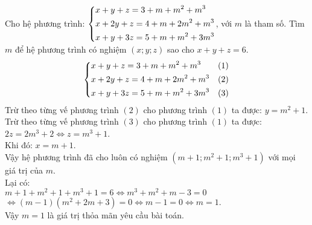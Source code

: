 \begin{ex}%
 Cho hệ phương trình: $\left\{\begin{aligned}& x+y+z=3+m+m^2+m^3 \\& x+2y+z=4+m+2m^2+m^3 \\& x+y+3z=5+m+m^2+3m^3\end{aligned}\right.$, với $m$ là tham số. Tìm $m$ để hệ phương trình có nghiệm $(x;y;z)$ sao cho $x + y + z = 6$.
 \loigiai
  {
  $$\left\{\begin{aligned}& x+y+z=3+m+m^2+m^3 & (1) \\& x+2y+z=4+m+2m^2+m^3 & (2) \\& x+y+3z=5+m+m^2+3m^3 & (3)\end{aligned}\right. $$
  Trừ theo từng vế phương trình $(2)$ cho phương trình $(1)$ ta được: $y = m^2 + 1$.\\
  Trừ theo từng vế phương trình $(3)$ cho phương trình $(1)$ ta được: $2z = 2m^3 + 2 \Leftrightarrow z = m^3 + 1$.\\
  Khi đó: $x = m + 1$.\\
  Vậy hệ phương trình đã cho luôn có nghiệm $(m+1; m^2+1; m^3+1)$ với mọi giá trị của $m$.\\
  Lại có:\\
  $m+1 + m^2+1 + m^3+1 = 6 \Leftrightarrow m^3+m^2+m-3 = 0$\\
  $\Leftrightarrow (m-1)(m^2+2m+3) = 0 \Leftrightarrow m-1 = 0 \Leftrightarrow m = 1$.\\
  Vậy $m = 1$ là giá trị thỏa mãn yêu cầu bài toán.
  }
\end{ex}


